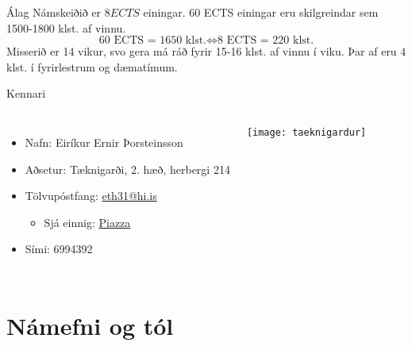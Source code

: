 \documentclass{beamer}
\begin{document}
\begin{frame}{Álag}
Námskeiðið er $8 ECTS$ einingar. 60 ECTS einingar eru skilgreindar sem 1500-1800 klst. af vinnu.
\[
\text{60 ECTS = 1650 klst.} \Longleftrightarrow \text{8 ECTS = 220 klst.}
\]
Misserið er 14 vikur, svo gera má ráð fyrir 15-16 klst. af vinnu í viku. Þar af eru 4 klst. í fyrirlestrum og dæmatímum.
\end{frame}


\begin{frame}{Kennari}
\begin{columns}
\begin{itemize}
 \item Nafn: Eiríkur Ernir Þorsteinsson
 \item Aðsetur: Tæknigarði, 2. hæð, herbergi 214
 \item Tölvupóstfang: \href{mailto:eth31@hi.is}{eth31@hi.is}
 \begin{itemize}
  \item Sjá einnig: \hyperlink{frame:piazza}{Piazza}
 \end{itemize}
 \item Sími: 6994392
\end{itemize}
\texttt{[image: taeknigardur]}
\end{columns}
\end{frame}

\section{Námefni og tól}
\end{document}
